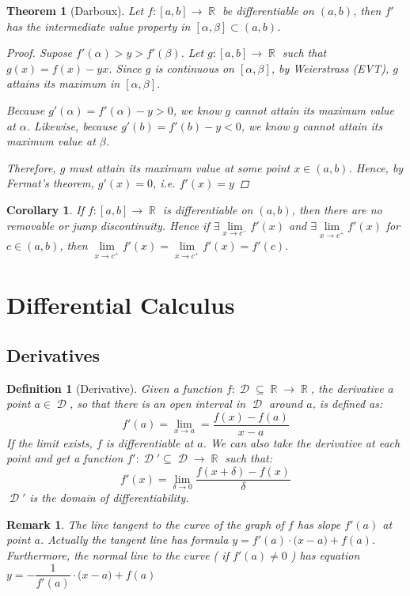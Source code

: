 \documentclass[12pt]{article}
\DeclareMathOperator{\R}{\mathbb{R}}
\DeclareMathOperator{\D}{\mathcal{D}}
\newtheorem{theorem}{Theorem}[subsection]
\newtheorem{definition}{Definition}[subsection]
\newtheorem{corollary}{Corollary}[subsection]
\newtheorem{remark}{Remark}[subsection]
\begin{document}
\begin{theorem}[Darboux]
  Let $f:[a,b]\to\R$ be differentiable on $(a,b)$, then $f'$ has the intermediate value property in $[\alpha,\beta]\subset(a,b)$.
  \begin{proof}
    Supose $f'(\alpha)>y>f'(\beta)$. Let $g:[a,b]\to\R$ such that $g (x)=f(x)-yx$.  Since $g$  is continuous on $[\alpha,\beta]$, by Weierstrass (EVT), $g$ attains its maximum in $[\alpha,\beta]$.
    
    Because $g'(\alpha)=f'(\alpha)-y>0$, we know $g$ cannot attain its maximum value at $\alpha$. Likewise, because $g'(b)=f'(b)-y<0$, we know $g$ cannot attain its maximum value at $\beta$.
    
    Therefore, $g$ must attain its maximum value at some point $x\in (a,b)$. Hence, by Fermat's theorem, $g'(x)=0$, i.e. $f'(x)=y$
  \end{proof}
\end{theorem}

\begin{corollary}
  If $f:[a,b]\to\R$ is differentiable on $(a,b)$, then there are no removable or jump discontinuity. Hence if $\exists\lim\limits_{x\to c^{-}}f'(x)$ and $\exists\lim\limits_{x\to c^{+}}f'(x)$ for $c\in (a,b)$, then $\lim\limits_{x\to c^{+}}f'(x)=\lim\limits_{x\to c^{+}}f'(x)=f'(c)$.
\end{corollary}

\pagebreak

\section{Differential Calculus}

\subsection{Derivatives}

\begin{definition}[Derivative]
  Given a function $f:\D\subseteq \R\to\R$, the derivative a point $a\in\D$, so that there is an open interval in $\D$ around $a$, is defined as: $$f'(a)=\lim_{x\to a}=\frac{f(x)-f(a)}{x-a}$$
  If the limit exists, $f$ is differentiable at $a$. We can also take the derivative at each point and get a function $f':\D'\subseteq\D\to\R$ such that:
  $$f'(x)=\lim_{\delta\to 0}\frac{f(x+\delta)-f(x)}{\delta}$$
  $\D'$ is the domain of differentiability.
\end{definition}

\begin{remark}
  The line tangent to the curve of the graph of $f$ has slope $f'(a)$ at point $a$. Actually the tangent line has formula $y=f'(a)\cdot \big(x-a\big)+f(a)$. Furthermore, the normal line to the curve ( if $f'(a)\neq 0$ ) has equation $y=-\dfrac{1}{f'(a)}\cdot \big(x-a\big)+f(a)$
\end{remark}
\end{document}
